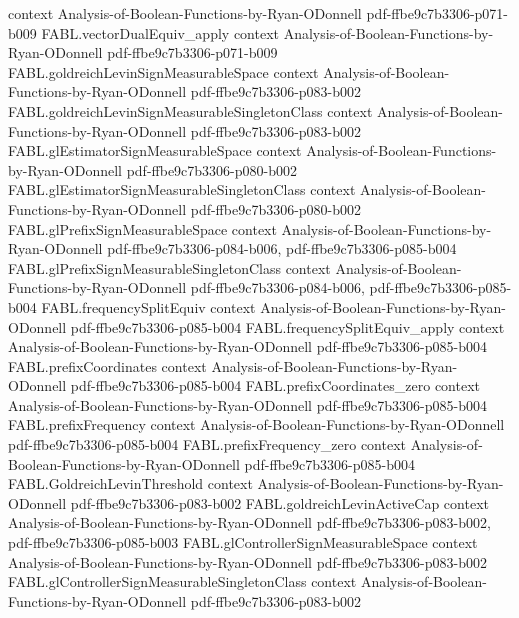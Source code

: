 \begin{theorem}
  {context}
  {Analysis-of-Boolean-Functions-by-Ryan-ODonnell}
  {pdf-ffbe9c7b3306-p071-b009}
\proofstep
  {FABL.vectorDualEquiv_apply}
  {context}
  {Analysis-of-Boolean-Functions-by-Ryan-ODonnell}
  {pdf-ffbe9c7b3306-p071-b009}
\proofstep
  {FABL.goldreichLevinSignMeasurableSpace}
  {context}
  {Analysis-of-Boolean-Functions-by-Ryan-ODonnell}
  {pdf-ffbe9c7b3306-p083-b002}
\proofstep
  {FABL.goldreichLevinSignMeasurableSingletonClass}
  {context}
  {Analysis-of-Boolean-Functions-by-Ryan-ODonnell}
  {pdf-ffbe9c7b3306-p083-b002}
\proofstep
  {FABL.glEstimatorSignMeasurableSpace}
  {context}
  {Analysis-of-Boolean-Functions-by-Ryan-ODonnell}
  {pdf-ffbe9c7b3306-p080-b002}
\proofstep
  {FABL.glEstimatorSignMeasurableSingletonClass}
  {context}
  {Analysis-of-Boolean-Functions-by-Ryan-ODonnell}
  {pdf-ffbe9c7b3306-p080-b002}
\proofstep
  {FABL.glPrefixSignMeasurableSpace}
  {context}
  {Analysis-of-Boolean-Functions-by-Ryan-ODonnell}
  {pdf-ffbe9c7b3306-p084-b006,
    pdf-ffbe9c7b3306-p085-b004}
\proofstep
  {FABL.glPrefixSignMeasurableSingletonClass}
  {context}
  {Analysis-of-Boolean-Functions-by-Ryan-ODonnell}
  {pdf-ffbe9c7b3306-p084-b006,
    pdf-ffbe9c7b3306-p085-b004}
\proofstep
  {FABL.frequencySplitEquiv}
  {context}
  {Analysis-of-Boolean-Functions-by-Ryan-ODonnell}
  {pdf-ffbe9c7b3306-p085-b004}
\proofstep
  {FABL.frequencySplitEquiv_apply}
  {context}
  {Analysis-of-Boolean-Functions-by-Ryan-ODonnell}
  {pdf-ffbe9c7b3306-p085-b004}
\proofstep
  {FABL.prefixCoordinates}
  {context}
  {Analysis-of-Boolean-Functions-by-Ryan-ODonnell}
  {pdf-ffbe9c7b3306-p085-b004}
\proofstep
  {FABL.prefixCoordinates_zero}
  {context}
  {Analysis-of-Boolean-Functions-by-Ryan-ODonnell}
  {pdf-ffbe9c7b3306-p085-b004}
\proofstep
  {FABL.prefixFrequency}
  {context}
  {Analysis-of-Boolean-Functions-by-Ryan-ODonnell}
  {pdf-ffbe9c7b3306-p085-b004}
\proofstep
  {FABL.prefixFrequency_zero}
  {context}
  {Analysis-of-Boolean-Functions-by-Ryan-ODonnell}
  {pdf-ffbe9c7b3306-p085-b004}
\proofstep
  {FABL.GoldreichLevinThreshold}
  {context}
  {Analysis-of-Boolean-Functions-by-Ryan-ODonnell}
  {pdf-ffbe9c7b3306-p083-b002}
\proofstep
  {FABL.goldreichLevinActiveCap}
  {context}
  {Analysis-of-Boolean-Functions-by-Ryan-ODonnell}
  {pdf-ffbe9c7b3306-p083-b002,
    pdf-ffbe9c7b3306-p085-b003}
\proofstep
  {FABL.glControllerSignMeasurableSpace}
  {context}
  {Analysis-of-Boolean-Functions-by-Ryan-ODonnell}
  {pdf-ffbe9c7b3306-p083-b002}
\proofstep
  {FABL.glControllerSignMeasurableSingletonClass}
  {context}
  {Analysis-of-Boolean-Functions-by-Ryan-ODonnell}
  {pdf-ffbe9c7b3306-p083-b002}

\end{theorem}
